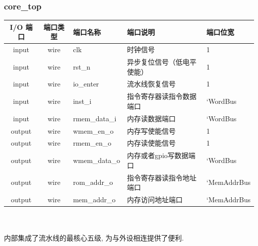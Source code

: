 \documentclass[lang=cn,11pt,a4paper,chinesefont=founder]{elegantpaper}
\begin{document}
\subsubsection{core\_top}
\begin{tabular}{cclll}
    \toprule
    I/O 端口 & 端口类型 & 端口名称      & 端口说明                   & 端口位宽    \\
    \midrule
    input    & wire     & clk           & 时钟信号                   & 1           \\
    input    & wire     & rst\_n        & 异步复位信号（低电平使能） & 1           \\
    input    & wire     & io\_enter     & 流水线恢复信号             & 1           \\

    input    & wire     & inst\_i       & 指令寄存器读指令数据端口   & `WordBus    \\
    input    & wire     & rmem\_data\_i & 内存读数据端口             & `WordBus    \\

    output   & wire     & wmem\_en\_o   & 内存写使能信号             & 1           \\
    output   & wire     & rmem\_en\_o   & 内存读使能信号             & 1           \\
    output   & wire     & wmem\_data\_o & 内存或者gpio写数据端口     & `WordBus    \\
    output   & wire     & rom\_addr\_o  & 指令寄存器读指令地址端口   & `MemAddrBus \\
    output   & wire     & mem\_addr\_o  & 内存访问地址端口           & `MemAddrBus \\
    \bottomrule
\end{tabular}\\
\\
内部集成了流水线的最核心五级, 为与外设相连提供了便利. 
\end{document}

